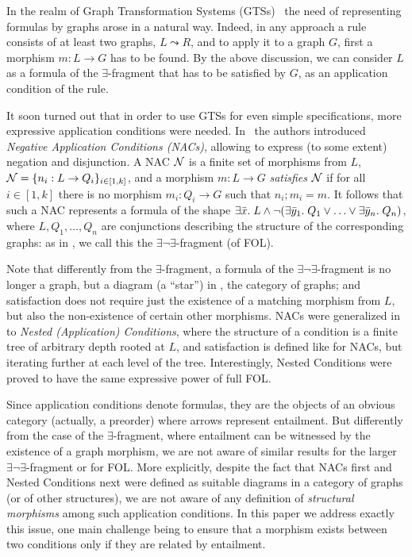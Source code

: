 In the realm of Graph Transformation Systems  (GTSs)~\cite{eept:fundamentals-agt,DBLP:books/sp/HeckelT20}
 the need of representing formulas by graphs arose in a natural way. Indeed,
in any approach a rule consists of at least two graphs, $L \leadsto R$, and to apply it to a graph $G$, first a morphism $m: L \to G$ has to be found. 
 By the above discussion, we can consider $L$ as a formula of the $\exists$-fragment that has to be satisfied by $G$, as an application condition of the rule. 

It soon turned out that in order to use GTSs for even simple specifications, more expressive application conditions were needed. 
In~\cite{NegativeAC} the authors introduced \emph{Negative Application Conditions (NACs)}, allowing to express (to some extent) negation and disjunction.  A NAC $\mathcal{N}$ is  a finite set of morphisms from $L$, $\mathcal{N} = \{n_i: L \rightarrow Q_i\}_{i\in[1,k]}$, and a morphism $m: L \to G$ \emph{satisfies} $\mathcal{N}$ if for all $i\in[1,k]$ there is no morphism $m_i: Q_i \to G$ such that $n_i;m_i = m$. 
It follows that such a NAC represents a formula of the shape $\exists \bar{x}.\; L \wedge \neg (\exists \bar{y}_1.\; Q_1 \vee \ldots \vee \exists \bar{y}_n.\; Q_n)$, where $L, Q_1, \ldots,Q_n$ are conjunctions describing the structure of the corresponding graphs: as in \cite{Rensink-FOL}, we call this the $\exists \neg \exists$-fragment (of FOL). 

Note that differently from the $\exists$-fragment, 
a formula of the $\exists \neg \exists$-fragment is no longer a graph, but a diagram (a ``star'') in , the category of graphs; and satisfaction does not require just the existence of a matching morphism from $L$, but also the non-existence of certain other morphisms.
%
NACs were generalized in~\cite{Rensink-FOL,Habel-FOL} to \emph{Nested (Application) Conditions}, where the structure of a condition is a finite tree of arbitrary depth rooted at $L$, and satisfaction is defined like for NACs, but iterating further at each level of the tree. Interestingly, Nested Conditions were proved to have the same expressive power of full FOL.

Since application conditions denote formulas, they are the objects of an obvious category (actually, a preorder) where arrows represent entailment. But differently from the case of the $\exists$-fragment, where entailment can be witnessed by the existence of a graph morphism, we are not aware of similar results for the larger $\exists \neg\exists$-fragment or for FOL. More explicitly, despite the fact that NACs first and Nested Conditions next were defined as suitable diagrams in a category of graphs (or of other structures), we are not aware of any definition of \emph{structural morphisms} among such application conditions. In this paper we address exactly this issue, one main challenge being to ensure that a morphism exists between two conditions only if they are related by entailment.

